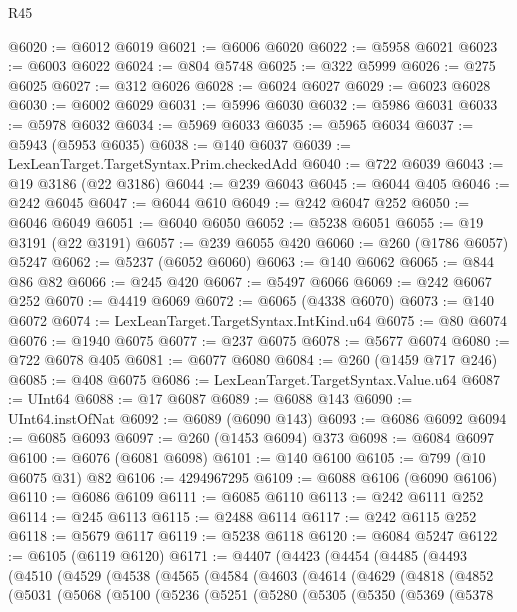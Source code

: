 \begin{lexlean}{R45}
\begin{coremodule}
{@6020 := @6012 @6019
@6021 := @6006 @6020
@6022 := @5958 @6021
@6023 := @6003 @6022
@6024 := @804 @5748
@6025 := @322 @5999
@6026 := @275 @6025
@6027 := @312 @6026
@6028 := @6024 @6027
@6029 := @6023 @6028
@6030 := @6002 @6029
@6031 := @5996 @6030
@6032 := @5986 @6031
@6033 := @5978 @6032
@6034 := @5969 @6033
@6035 := @5965 @6034
@6037 := @5943 (@5953 @6035)
@6038 := @140 @6037
@6039 := LexLeanTarget.TargetSyntax.Prim.checkedAdd
@6040 := @722 @6039
@6043 := @19 @3186 (@22 @3186)
@6044 := @239 @6043
@6045 := @6044 @405
@6046 := @242 @6045
@6047 := @6044 @610
@6049 := @242 @6047 @252
@6050 := @6046 @6049
@6051 := @6040 @6050
@6052 := @5238 @6051
@6055 := @19 @3191 (@22 @3191)
@6057 := @239 @6055 @420
@6060 := @260 (@1786 @6057) @5247
@6062 := @5237 (@6052 @6060)
@6063 := @140 @6062
@6065 := @844 @86 @82
@6066 := @245 @420
@6067 := @5497 @6066
@6069 := @242 @6067 @252
@6070 := @4419 @6069
@6072 := @6065 (@4338 @6070)
@6073 := @140 @6072
@6074 := LexLeanTarget.TargetSyntax.IntKind.u64
@6075 := @80 @6074
@6076 := @1940 @6075
@6077 := @237 @6075
@6078 := @5677 @6074
@6080 := @722 @6078 @405
@6081 := @6077 @6080
@6084 := @260 (@1459 @717 @246)
@6085 := @408 @6075
@6086 := LexLeanTarget.TargetSyntax.Value.u64
@6087 := UInt64
@6088 := @17 @6087
@6089 := @6088 @143
@6090 := UInt64.instOfNat
@6092 := @6089 (@6090 @143)
@6093 := @6086 @6092
@6094 := @6085 @6093
@6097 := @260 (@1453 @6094) @373
@6098 := @6084 @6097
@6100 := @6076 (@6081 @6098)
@6101 := @140 @6100
@6105 := @799 (@10 @6075 @31) @82
@6106 := 4294967295
@6109 := @6088 @6106 (@6090 @6106)
@6110 := @6086 @6109
@6111 := @6085 @6110
@6113 := @242 @6111 @252
@6114 := @245 @6113
@6115 := @2488 @6114
@6117 := @242 @6115 @252
@6118 := @5679 @6117
@6119 := @5238 @6118
@6120 := @6084 @5247
@6122 := @6105 (@6119 @6120)
@6171 := @4407
    (@4423
      (@4454
        (@4485
          (@4493
            (@4510
              (@4529
                (@4538
                  (@4565
                    (@4584
                      (@4603
                        (@4614
                          (@4629
                            (@4818
                              (@4852
                                (@5031
                                  (@5068
                                    (@5100
                                      (@5236
                                        (@5251
                                          (@5280
                                            (@5305
                                              (@5350
                                                (@5369
                                                  (@5378
}
\end{coremodule}
\end{lexlean}
